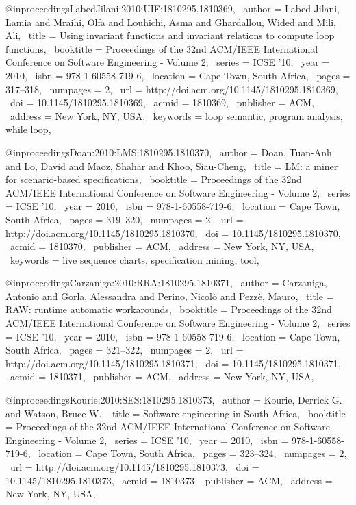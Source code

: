 @inproceedings{LabedJilani:2010:UIF:1810295.1810369,
 author = {Labed Jilani, Lamia and Mraihi, Olfa and Louhichi, Asma and Ghardallou, Wided and Mili, Ali},
 title = {Using invariant functions and invariant relations to compute loop functions},
 booktitle = {Proceedings of the 32nd ACM/IEEE International Conference on Software Engineering - Volume 2},
 series = {ICSE '10},
 year = {2010},
 isbn = {978-1-60558-719-6},
 location = {Cape Town, South Africa},
 pages = {317--318},
 numpages = {2},
 url = {http://doi.acm.org/10.1145/1810295.1810369},
 doi = {10.1145/1810295.1810369},
 acmid = {1810369},
 publisher = {ACM},
 address = {New York, NY, USA},
 keywords = {loop semantic, program analysis, while loop},
} 

@inproceedings{Doan:2010:LMS:1810295.1810370,
 author = {Doan, Tuan-Anh and Lo, David and Maoz, Shahar and Khoo, Siau-Cheng},
 title = {LM: a miner for scenario-based specifications},
 booktitle = {Proceedings of the 32nd ACM/IEEE International Conference on Software Engineering - Volume 2},
 series = {ICSE '10},
 year = {2010},
 isbn = {978-1-60558-719-6},
 location = {Cape Town, South Africa},
 pages = {319--320},
 numpages = {2},
 url = {http://doi.acm.org/10.1145/1810295.1810370},
 doi = {10.1145/1810295.1810370},
 acmid = {1810370},
 publisher = {ACM},
 address = {New York, NY, USA},
 keywords = {live sequence charts, specification mining, tool},
} 

@inproceedings{Carzaniga:2010:RRA:1810295.1810371,
 author = {Carzaniga, Antonio and Gorla, Alessandra and Perino, Nicol\`{o} and Pezz\`{e}, Mauro},
 title = {RAW: runtime automatic workarounds},
 booktitle = {Proceedings of the 32nd ACM/IEEE International Conference on Software Engineering - Volume 2},
 series = {ICSE '10},
 year = {2010},
 isbn = {978-1-60558-719-6},
 location = {Cape Town, South Africa},
 pages = {321--322},
 numpages = {2},
 url = {http://doi.acm.org/10.1145/1810295.1810371},
 doi = {10.1145/1810295.1810371},
 acmid = {1810371},
 publisher = {ACM},
 address = {New York, NY, USA},
} 

@inproceedings{Kourie:2010:SES:1810295.1810373,
 author = {Kourie, Derrick G. and Watson, Bruce W.},
 title = {Software engineering in South Africa},
 booktitle = {Proceedings of the 32nd ACM/IEEE International Conference on Software Engineering - Volume 2},
 series = {ICSE '10},
 year = {2010},
 isbn = {978-1-60558-719-6},
 location = {Cape Town, South Africa},
 pages = {323--324},
 numpages = {2},
 url = {http://doi.acm.org/10.1145/1810295.1810373},
 doi = {10.1145/1810295.1810373},
 acmid = {1810373},
 publisher = {ACM},
 address = {New York, NY, USA},
} 

